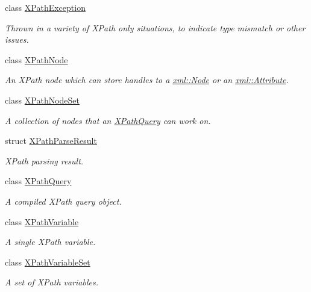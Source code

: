 \begin{DoxyCompactItemize}
class \hyperlink{classMezzanine_1_1xml_1_1XPathException}{XPathException}
\begin{DoxyCompactList}\small\item\em Thrown in a variety of XPath only situations, to indicate type mismatch or other issues. \item\end{DoxyCompactList}\item 
class \hyperlink{classMezzanine_1_1xml_1_1XPathNode}{XPathNode}
\begin{DoxyCompactList}\small\item\em An XPath node which can store handles to a \hyperlink{classMezzanine_1_1xml_1_1Node}{xml::Node} or an \hyperlink{classMezzanine_1_1xml_1_1Attribute}{xml::Attribute}. \item\end{DoxyCompactList}\item 
class \hyperlink{classMezzanine_1_1xml_1_1XPathNodeSet}{XPathNodeSet}
\begin{DoxyCompactList}\small\item\em A collection of nodes that an \hyperlink{classMezzanine_1_1xml_1_1XPathQuery}{XPathQuery} can work on. \item\end{DoxyCompactList}\item 
struct \hyperlink{structMezzanine_1_1xml_1_1XPathParseResult}{XPathParseResult}
\begin{DoxyCompactList}\small\item\em XPath parsing result. \item\end{DoxyCompactList}\item 
class \hyperlink{classMezzanine_1_1xml_1_1XPathQuery}{XPathQuery}
\begin{DoxyCompactList}\small\item\em A compiled XPath query object. \item\end{DoxyCompactList}\item 
class \hyperlink{classMezzanine_1_1xml_1_1XPathVariable}{XPathVariable}
\begin{DoxyCompactList}\small\item\em A single XPath variable. \item\end{DoxyCompactList}\item 
class \hyperlink{classMezzanine_1_1xml_1_1XPathVariableSet}{XPathVariableSet}
\begin{DoxyCompactList}\small\item\em A set of XPath variables. \item\end{DoxyCompactList}\end{DoxyCompactItemize}
